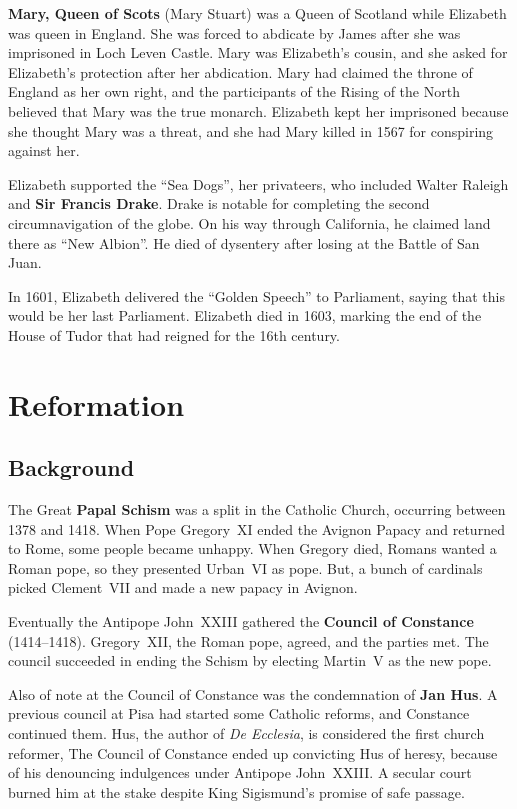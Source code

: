 \textbf{Mary, Queen of Scots} (Mary Stuart) was a Queen of Scotland while Elizabeth was queen in England.
She was forced to abdicate by James after she was imprisoned in Loch Leven Castle.
Mary was Elizabeth's cousin, and she asked for Elizabeth's protection after her abdication.
Mary had claimed the throne of England as her own right,
and the participants of the Rising of the North believed that Mary was the true monarch.
Elizabeth kept her imprisoned because she thought Mary was a threat,
and she had Mary killed in 1567 for conspiring against her.

Elizabeth supported the ``Sea Dogs'', her privateers,
who included Walter Raleigh and \textbf{Sir Francis Drake}.
Drake is notable for completing the second circumnavigation of the globe.
On his way through California, he claimed land there as ``New Albion''.
He died of dysentery after losing at the Battle of San Juan.

In 1601, Elizabeth delivered the ``Golden Speech'' to Parliament,
saying that this would be her last Parliament.
Elizabeth died in 1603, marking the end of the House of Tudor that had reigned for the 16th century.

\section{Reformation}

\subsection*{Background}

The Great \textbf{Papal Schism} was a split in the Catholic Church, occurring between 1378 and 1418.
When Pope Gregory~XI ended the Avignon Papacy and returned to Rome, some people became unhappy.
When Gregory died, Romans wanted a Roman pope, so they presented Urban~VI as pope.
But, a bunch of cardinals picked Clement~VII and made a new papacy in Avignon.

Eventually the Antipope John~XXIII gathered the \textbf{Council of Constance} (1414--1418).
Gregory~XII, the Roman pope, agreed, and the parties met.
The council succeeded in ending the Schism by electing Martin~V as the new pope.

Also of note at the Council of Constance was the condemnation of \textbf{Jan Hus}.
A previous council at Pisa had started some Catholic reforms, and Constance continued them.
Hus, the author of \textit{De Ecclesia}, is considered the first church reformer,
The Council of Constance ended up convicting Hus of heresy,
because of his denouncing indulgences under Antipope John~XXIII\@.
A secular court burned him at the stake despite King Sigismund's promise of safe passage.

